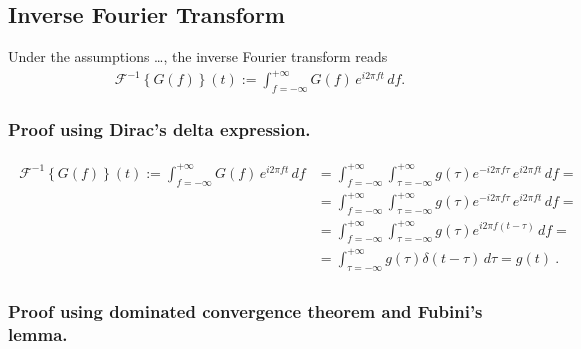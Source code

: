 \documentclass[letterpaper,10pt,english]{jupyterBook}
\begin{document}
\subsection{Inverse Fourier Transform}
\label{\detokenize{ch/complex/fourier-transform:inverse-fourier-transform}}\label{\detokenize{ch/complex/fourier-transform:complex-fourier-transform-inverse}}
\sphinxAtStartPar
Under the assumptions …, the inverse Fourier transform reads
\begin{equation*}
\begin{split}\mathscr{F}^{-1}\left\{ G(f) \right\}(t) := \int_{f = -\infty}^{+\infty} G(f) \, e^{i 2 \pi f t} \, df .\end{split}
\end{equation*}\subsubsection*{Proof using Dirac’s delta expression.}
\begin{equation*}
\begin{split}\begin{aligned}
\mathscr{F}^{-1}\left\{ G(f) \right\}(t) := \int_{f = -\infty}^{+\infty} G(f) \, e^{i 2 \pi f t} \, df 
  & = \int_{f = -\infty}^{+\infty} \int_{\tau=-\infty}^{+\infty} g(\tau) e^{-i 2 \pi f \tau} \, e^{i 2 \pi f t} \, df = \\ 
  & = \int_{f = -\infty}^{+\infty} \int_{\tau=-\infty}^{+\infty} g(\tau) e^{-i 2 \pi f \tau} \, e^{i 2 \pi f t} \, df = \\ 
  & = \int_{f = -\infty}^{+\infty} \int_{\tau=-\infty}^{+\infty} g(\tau) e^{i 2 \pi f (t-\tau)} \, df = \\ 
  & = \int_{\tau=-\infty}^{+\infty} g(\tau) \delta(t-\tau) \, d\tau = g(t) \ . 
\end{aligned}\end{split}
\end{equation*}\subsubsection*{Proof using dominated convergence theorem and Fubini’s lemma.}
\end{document}
